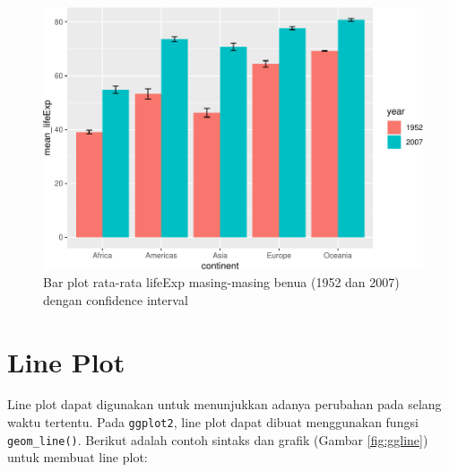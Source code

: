 \documentclass[]{book}
\newenvironment{Shaded}{\begin{snugshade}}{\end{snugshade}}
\newcommand{\KeywordTok}[1]{\textcolor[rgb]{0.13,0.29,0.53}{\textbf{#1}}}
\newcommand{\DataTypeTok}[1]{\textcolor[rgb]{0.13,0.29,0.53}{#1}}
\newcommand{\StringTok}[1]{\textcolor[rgb]{0.31,0.60,0.02}{#1}}
\newcommand{\CommentTok}[1]{\textcolor[rgb]{0.56,0.35,0.01}{\textit{#1}}}
\newcommand{\OperatorTok}[1]{\textcolor[rgb]{0.81,0.36,0.00}{\textbf{#1}}}
\newcommand{\NormalTok}[1]{#1}
\begin{document}
\begin{figure}

{\centering \includegraphics[width=0.7\linewidth]{EnvStat_files/figure-latex/ggbar3-1} 

}

\caption{Bar plot rata-rata lifeExp masing-masing benua (1952 dan 2007) dengan confidence interval}\label{fig:ggbar3}
\end{figure}

\section{Line Plot}\label{line-plot-1}

Line plot dapat digunakan untuk menunjukkan adanya perubahan pada selang
waktu tertentu. Pada \texttt{ggplot2}, line plot dapat dibuat
menggunakan fungsi \texttt{geom\_line()}. Berikut adalah contoh sintaks
dan grafik (Gambar \ref{fig:ggline}) untuk membuat line plot:

\begin{Shaded}
\end{Shaded}
\end{document}
